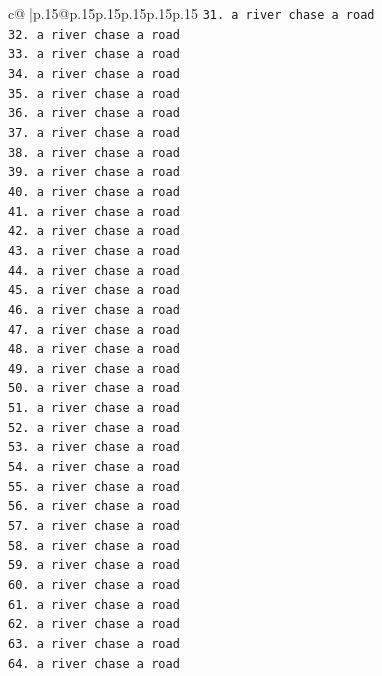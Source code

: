 \documentclass{article}
\begin{document}
{\begin{supertabular}{c@{$\;$}|p{.15\linewidth}@{}p{.15\linewidth}p{.15\linewidth}p{.15\linewidth}p{.15\linewidth}p{.15\linewidth}}
{{{\texttt{31. a river chase a road} \\
\texttt{32. a river chase a road} \\
\texttt{33. a river chase a road} \\
\texttt{34. a river chase a road} \\
\texttt{35. a river chase a road} \\
\texttt{36. a river chase a road} \\
\texttt{37. a river chase a road} \\
\texttt{38. a river chase a road} \\
\texttt{39. a river chase a road} \\
\texttt{40. a river chase a road} \\
\texttt{41. a river chase a road} \\
\texttt{42. a river chase a road} \\
\texttt{43. a river chase a road} \\
\texttt{44. a river chase a road} \\
\texttt{45. a river chase a road} \\
\texttt{46. a river chase a road} \\
\texttt{47. a river chase a road} \\
\texttt{48. a river chase a road} \\
\texttt{49. a river chase a road} \\
\texttt{50. a river chase a road} \\
\texttt{51. a river chase a road} \\
\texttt{52. a river chase a road} \\
\texttt{53. a river chase a road} \\
\texttt{54. a river chase a road} \\
\texttt{55. a river chase a road} \\
\texttt{56. a river chase a road} \\
\texttt{57. a river chase a road} \\
\texttt{58. a river chase a road} \\
\texttt{59. a river chase a road} \\
\texttt{60. a river chase a road} \\
\texttt{61. a river chase a road} \\
\texttt{62. a river chase a road} \\
\texttt{63. a river chase a road} \\
\texttt{64. a river chase a road} \\
}}}
\end{supertabular}}
\end{document}
